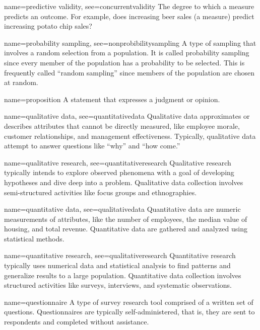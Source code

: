 {name={predictive validity},
	see={concurrentvalidity}}
{%
	The degree to which a measure predicts an outcome. For example, does increasing beer sales (a measure) predict increasing potato chip sales?
}

{name={probability sampling},
	see={nonprobibilitysampling}}
{%
	A type of sampling that involves a random selection from a population. It is called probability sampling since every member of the population has a probability to be selected. This is frequently called ``random sampling'' since members of the population are chosen at random. 
}

{name={proposition}}
{%
	A statement that expresses a judgment or opinion.
}

{name={qualitative data},
	see={quantitativedata}}
{%
	Qualitative data approximates or describes attributes that cannot be directly measured, like employee morale, customer relationships, and management effectiveness. Typically, qualitative data attempt to answer questions like ``why'' and ``how come.'' 
}

{name={qualitative research},
	see={quantitativeresearch}}
{%
	Qualitative research typically intends to explore observed phenomena with a goal of developing hypotheses and dive deep into a problem. Qualitative data collection involves semi-structured activities like focus groups and ethnographies.
}

{name={quantitative data},
	see={qualitativedata}}
{%
	Quantitative data are numeric measurements of attributes, like the number of employees, the median value of housing, and total revenue. Quantitative data are gathered and analyzed using statistical methods.
}

{name={quantitative research},
	see={qualitativeresearch}}
{%
	Quantitative research typically uses numerical data and statistical analysis to find patterns and generalize results to a large population. Quantitative data collection involves structured activities like surveys, interviews, and systematic observations.
}

{name={questionnaire}}
{%
	A type of survey research tool comprised of a written set of questions. Questionnaires are typically self-administered, that is, they are sent to respondents and completed without assistance.
}

